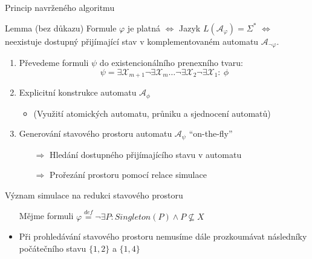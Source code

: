 \documentclass{beamer}
\begin{document}
	\begin{frame}[t]{Princip navrženého algoritmu}
	\begin{block}{Lemma (bez důkazu)}
	 Formule $\varphi$ je platná $\Leftrightarrow$ Jazyk $L(\mathcal{A}_\varphi) = \Sigma^*$ $\Leftrightarrow$ neexistuje dostupný přijímající stav v komplementovaném automatu $\mathcal{A}_{\neg\varphi}$.
	\end{block}
	\pause
	\begin{enumerate}
	 \item Převedeme formuli $\psi$ do existencionálního prenexního tvaru:
	$$\psi = \exists \mathcal{X}_{m+1}\neg\exists \mathcal{X}_m\ldots\neg\exists
\mathcal{X}_2\neg\exists \mathcal{X}_1:\ \phi$$
\pause
	 \item Explicitní konstrukce automatu $\mathcal{A}_{\phi}$
	 \begin{itemize}
	  \item (Využití atomických automatu, průniku a sjednocení automatů)
	 \end{itemize}
\pause
	 \item Generování stavového prostoru automatu $\mathcal{A}_\psi$ "`on-the-fly"'
	\begin{itemize}
\pause
	 \item[$\Rightarrow$]Hledání dostupného přijímajícího stavu v automatu
\pause
	 \item[$\Rightarrow$]Prořezání prostoru pomocí relace simulace
	\end{itemize}
	\end{enumerate}
	\end{frame}
	
	\begin{frame}{Význam simulace na redukci stavového prostoru}
	 \begin{itemize}
    \item[] Mějme formuli $\varphi \overset{\mathit{def}}{=}
    \neg\exists P:
    Singleton(P) \wedge P
    \not\subseteq X$
	\item Při prohledávání stavového prostoru nemusíme dále prozkoumávat následníky
	počátečního stavu $\{1, 2\}$ a $\{1, 4\}$
    \end{itemize}
    
      \begin{figure}
 \begin{center}
 \end{center}
\end{figure}
	\end{frame}
	
\end{document}
